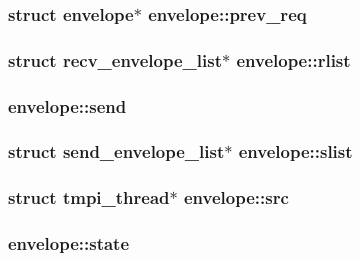\hypertarget{structenvelope_ad730f6becbe25a7de3c17601b080c7d2}{
\subsubsection[{prev\-\_\-req}]{\setlength{\rightskip}{0pt plus 5cm}struct {\bf envelope}$\ast$ {\bf envelope\-::prev\-\_\-req}}}\label{structenvelope_ad730f6becbe25a7de3c17601b080c7d2}
\hypertarget{structenvelope_a62d09c7ab58294fe3f19c6ac2b622b06}{
\subsubsection[{rlist}]{\setlength{\rightskip}{0pt plus 5cm}struct {\bf recv\-\_\-envelope\-\_\-list}$\ast$ {\bf envelope\-::rlist}}}\label{structenvelope_a62d09c7ab58294fe3f19c6ac2b622b06}
\hypertarget{structenvelope_ab42ac0d9da703327ec9aa200bbe9bbae}{
\subsubsection[{send}]{ {\bf envelope\-::send}}}\label{structenvelope_ab42ac0d9da703327ec9aa200bbe9bbae}
\hypertarget{structenvelope_a85e70f590b431d5c918e23c7bc4af7d7}{
\subsubsection[{slist}]{\setlength{\rightskip}{0pt plus 5cm}struct {\bf send\-\_\-envelope\-\_\-list}$\ast$ {\bf envelope\-::slist}}}\label{structenvelope_a85e70f590b431d5c918e23c7bc4af7d7}
\hypertarget{structenvelope_a0190bde34d8a5e4d756c099167f01704}{
\subsubsection[{src}]{\setlength{\rightskip}{0pt plus 5cm}struct {\bf tmpi\-\_\-thread}$\ast$ {\bf envelope\-::src}}}\label{structenvelope_a0190bde34d8a5e4d756c099167f01704}
\hypertarget{structenvelope_ab1928ed53037cef17c0f8352052400d4}{
\subsubsection[{state}]{ {\bf envelope\-::state}}}\label{structenvelope_ab1928ed53037cef17c0f8352052400d4}

